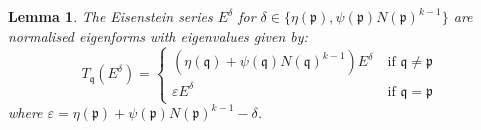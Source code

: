 \documentclass[a4paper,oneside]{amsart}
\theoremstyle{plain}
\newtheorem{lem}[thm]{Lemma}
\theoremstyle{definition}
\begin{document}
\begin{lem}
    The Eisenstein series $E^\delta$ for $\delta \in \{\eta(\mathfrak{p}), \psi(\mathfrak{p})N(\mathfrak{p})^{k-1}\} $ are normalised eigenforms with eigenvalues given by:
    \begin{equation*}
        T_{\mathfrak{q}}(E^\delta) = \begin{cases}
            (\eta(\mathfrak{q})+\psi(\mathfrak{q})N(\mathfrak{q})^{k-1}) E^\delta \ &\text{if } \mathfrak{q} \neq \mathfrak{p}\\
            \varepsilon E^\delta \ &\text{if } \mathfrak{q} = \mathfrak{p}
        \end{cases}
    \end{equation*}
    where $\varepsilon = \eta(\mathfrak{p})+\psi(\mathfrak{p})N(\mathfrak{p})^{k-1} - \delta$.
    
\end{lem}
\end{document}
